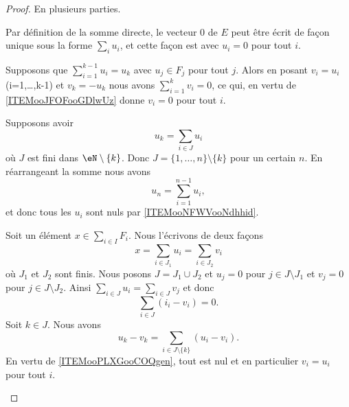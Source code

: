 \begin{proof}
	En plusieurs parties.
	\begin{subproof}
		Par définition de la somme directe, le vecteur \( 0\) de \( E\) peut être écrit de façon unique sous la forme \( \sum_iu_i\), et cette façon est avec \( u_i=0\) pour tout \( i\).

		Supposons que \( \sum_{i=1}^{k-1}u_i=u_k\) avec \( u_j\in F_j\) pour tout \( j\). Alors en posant \( v_i=u_i\) (i=1,\ldots,k-1) et \( v_{k}=-u_k\) nous avons \( \sum_{i=1}^kv_i=0\), ce qui, en vertu de \ref{ITEMooJFOFooGDlwUz} donne \( v_i=0\) pour tout \( i\).

		Supposons avoir
		\begin{equation}
			u_k=\sum_{i\in J}u_i
		\end{equation}
		où \( J\) est fini dans \( \eN\setminus\{ k \}\). Donc \( J=\{ 1,\ldots,n \}\setminus\{ k \}\) pour un certain \( n\). En réarrangeant la somme nous avons
		\begin{equation}
			u_n=\sum_{i=1}^{n-1}u_i,
		\end{equation}
		et donc tous les \( u_i\) sont nuls par \ref{ITEMooNFWVooNdhhid}.

		Soit un élément \( x\in \sum_{i\in I}F_i\). Nous l'écrivons de deux façons
		\begin{equation}
			x=\sum_{i\in J_1}u_i=\sum_{i\in J_2}v_i
		\end{equation}
		où \( J_1\) et \( J_2\) sont finis. Nous posons \( J=J_1\cup J_2\) et \( u_j=0\) pour \( j\in J\setminus J_1\) et \( v_j=0\) pour \( j\in J\setminus J_2\). Ainsi \( \sum_{i\in J}u_i=\sum_{i\in J}v_j\) et donc
		\begin{equation}
			\sum_{i\in J}(i_i-v_i)=0.
		\end{equation}
		Soit \( k\in J\). Nous avons
		\begin{equation}
			u_k-v_k=\sum_{i\in J\setminus \{ k \}}(u_i-v_i).
		\end{equation}
		En vertu de \ref{ITEMooPLXGooCOQgen}, tout est nul et en particulier \( v_i=u_i\) pour tout \( i\).
	\end{subproof}
\end{proof}

